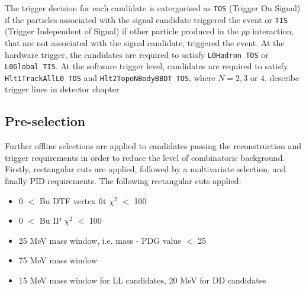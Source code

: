 The trigger decision for each candidate is catergorised as {\tt TOS} (Trigger On Signal) if the particles associated with the signal candidate triggered the event or {\tt TIS} (Trigger Independent of Signal) if other particle produced in the $pp$ interaction, that are not associated with the signal candidate, triggered the event. At the hardware trigger, the \B candidates are required to satisfy {\tt L0Hadron TOS} or {\tt L0Global TIS}. At the software trigger level, \B candidates are required to satisfy {\tt Hlt1TrackAllL0 TOS} and {\tt Hlt2TopoNBodyBBDT TOS}, where $N = 2,3 \text{ or } 4$. {\color{red}describe trigger lines in detector chapter}


%

\subsection{Pre-selection}
\label{sec:selection:pre-selection}

Further offline selections are applied to candidates passing the reconstruction and trigger requirements in order to reduce the level of combinatoric background. Firstly, rectangular cuts are applied, followed by a multivariate selection, and finally PID requirements. The following rectangular cuts applied:

\begin{itemize}
\item 0 $<$ Bu DTF vertex fit $\chi^2$ $<$ 100
\item 0 $<$ Bu IP $\chi^2$ $<$ 100
\item 25 MeV \Dz mass window, i.e. \textbar \Dz mass - PDG value \textbar $<$ 25 \mev
\item 75 MeV \Kstarm mass window
\item 15 MeV \KS mass window for LL candidates, 20 MeV for DD candidates
\end{itemize}

